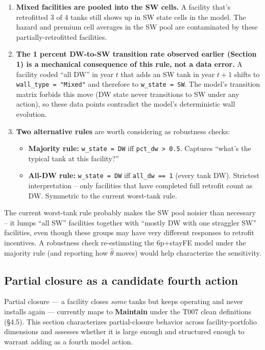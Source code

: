 \documentclass[
  11pt,
]{article}
\providecommand{\tightlist}{%
  \setlength{\itemsep}{0pt}\setlength{\parskip}{0pt}}\usepackage{longtable,booktabs,array}
\begin{document}
\begin{enumerate}
\def\labelenumi{\arabic{enumi}.}
\item
  \textbf{Mixed facilities are pooled into the SW cells.} A facility
  that's retrofitted 3 of 4 tanks still shows up in SW state cells in
  the model. The hazard and premium cell averages in the SW pool are
  contaminated by these partially-retrofitted facilities.
\item
  \textbf{The 1 percent DW-to-SW transition rate observed earlier
  (Section 1) is a mechanical consequence of this rule, not a data
  error.} A facility coded ``all DW'' in year \(t\) that adds an SW tank
  in year \(t+1\) shifts to \texttt{wall\_type\ =\ "Mixed"} and
  therefore to \texttt{w\_state\ =\ SW}. The model's transition matrix
  forbids this move (DW state never transitions to SW under any action),
  so these data points contradict the model's deterministic wall
  evolution.
\item
  \textbf{Two alternative rules} are worth considering as robustness
  checks:

  \begin{itemize}
  \tightlist
  \item
    \textbf{Majority rule:} \texttt{w\_state\ =\ DW} iff
    \texttt{pct\_dw\ \textgreater{}\ 0.5}. Captures ``what's the typical
    tank at this facility?''
  \item
    \textbf{All-DW rule:} \texttt{w\_state\ =\ DW} iff
    \texttt{all\_dw\ ==\ 1} (every tank DW). Strictest interpretation --
    only facilities that have completed full retrofit count as DW.
    Symmetric to the current worst-tank rule.
  \end{itemize}
\end{enumerate}

The current worst-tank rule probably makes the SW pool noisier than
necessary -- it lumps ``all SW'' facilities together with ``mostly DW
with one straggler SW'' facilities, even though these groups may have
very different responses to retrofit incentives. A robustness check
re-estimating the 6p+stayFE model under the majority rule (and reporting
how \(\hat\theta\) moves) would help characterize the sensitivity.

\subsection{Partial closure as a candidate fourth
action}\label{sec-partial-closure-action}

Partial closure --- a facility closes \emph{some} tanks but keeps
operating and never installs again --- currently maps to
\textbf{Maintain} under the T007 clean definitions (§4.5). This section
characterizes partial-closure behavior across facility-portfolio
dimensions and assesses whether it is large enough and structured enough
to warrant adding as a fourth model action.
\end{document}
